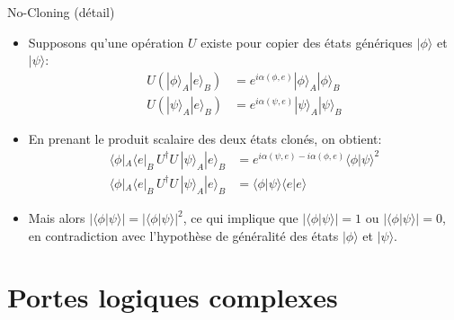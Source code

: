 \documentclass[aspectratio=169,12pt]{beamer}
\begin{document}
\begin{frame}{No-Cloning (détail)}
    \begin{itemize}
        \item Supposons qu'une opération $U$ existe pour copier des états génériques $|\phi \rangle$ et $|\psi \rangle$:
        \begin{align*}
            U(|\phi \rangle _{A}|e\rangle _{B}) &= e^{i\alpha (\phi ,e)}|\phi \rangle _{A}|\phi \rangle _{B} \\
            U(|\psi \rangle _{A}|e\rangle _{B}) &= e^{i\alpha (\psi ,e)}|\psi \rangle _{A}|\psi \rangle _{B}
        \end{align*}
        \item En prenant le produit scalaire des deux états clonés, on obtient:
        \begin{align*}
            \langle \phi|_{A}\langle e|_{B} \, U^\dagger U \, |\psi \rangle _{A}|e\rangle _{B} &= e^{i\alpha (\psi ,e)-i\alpha (\phi ,e)}\langle \phi |\psi \rangle ^{2} \\
            \langle \phi|_{A}\langle e|_{B} \, U^\dagger U \, |\psi \rangle _{A}|e\rangle _{B} &= \langle \phi |\psi \rangle \langle e |e \rangle
        \end{align*}
        \item Mais alors $|\langle \phi |\psi \rangle| = |\langle \phi |\psi \rangle|^{2}$, ce qui implique que $|\langle \phi |\psi \rangle |=1$ ou $|\langle \phi |\psi \rangle |=0$, en contradiction avec l'hypothèse de généralité des états $|\phi \rangle$ et $|\psi \rangle$.
    \end{itemize}
\end{frame}

\section{Portes logiques complexes}
\end{document}
